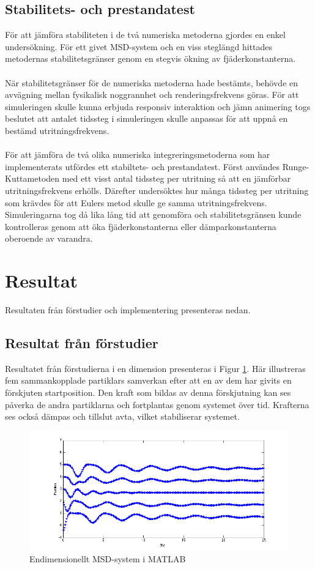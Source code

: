 \documentclass[a4paper,12pt,oneside,final,swedish]{extarticle}
\begin{document}
\subsection{Stabilitets- och prestandatest}
För att jämföra stabiliteten i de två numeriska metoderna gjordes en enkel undersökning. För ett givet MSD-system och en viss steglängd hittades metodernas stabilitetsgränser genom en stegvis ökning av fjäderkonstanterna.
\\\\När stabilitetsgränser för de numeriska metoderna hade bestämts, behövde en avvägning mellan fysikalisk noggrannhet och renderingsfrekvens göras. För att simuleringen skulle kunna erbjuda responsiv interaktion och jämn animering togs beslutet att antalet tidssteg i simuleringen skulle anpassas för att uppnå en bestämd utritningsfrekvens.
\\\\För att jämföra de två olika numeriska integreringsmetoderna som har implementerats utfördes ett stabiltets- och prestandatest. Först användes Runge-Kuttametoden med ett visst antal tidssteg per utritning så att en jämförbar utritningsfrekvens erhölls. Därefter undersöktes hur många tidssteg per utritning som krävdes för att Eulers metod skulle ge samma utritningsfrekvens. Simuleringarna tog då lika lång tid att genomföra och stabilitetsgränsen kunde kontrolleras genom att öka fjäderkonstanterna eller dämparkonstanterna oberoende av varandra.
\section{Resultat}
Resultaten från förstudier och implementering presenteras nedan.
\subsection{Resultat från förstudier}
Resultatet från förstudierna i en dimension presenteras i Figur \ref{endim}. Här illustreras fem sammankopplade partiklars samverkan efter att en av dem har givits en förskjuten startposition. Den kraft som bildas av denna förskjutning kan ses påverka de andra partiklarna och fortplantas genom systemet över tid. Krafterna ses också dämpas och tillslut avta, vilket stabiliserar systemet.

\begin{figure}[h!]
  \begin{center}
    \includegraphics[width=16cm]{Bilder/1D_matlab.png} 
  \end{center}
  \caption{Endimensionellt MSD-system i MATLAB}
  \label{endim}
\end{figure}
\end{document}
